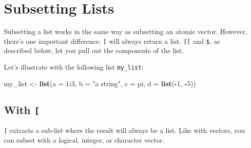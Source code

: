 \documentclass[]{book}
\newenvironment{Shaded}{\begin{snugshade}}{\end{snugshade}}
\newcommand{\KeywordTok}[1]{\textcolor[rgb]{0.13,0.29,0.53}{\textbf{#1}}}
\newcommand{\DataTypeTok}[1]{\textcolor[rgb]{0.13,0.29,0.53}{#1}}
\newcommand{\DecValTok}[1]{\textcolor[rgb]{0.00,0.00,0.81}{#1}}
\newcommand{\StringTok}[1]{\textcolor[rgb]{0.31,0.60,0.02}{#1}}
\newcommand{\CommentTok}[1]{\textcolor[rgb]{0.56,0.35,0.01}{\textit{#1}}}
\newcommand{\OperatorTok}[1]{\textcolor[rgb]{0.81,0.36,0.00}{\textbf{#1}}}
\newcommand{\NormalTok}[1]{#1}
\begin{document}
\section{Subsetting Lists}\label{subsetting-lists}

Subsetting a list works in the same way as subsetting an atomic vector.
However, there's one important difference: \texttt{{[}} will always
return a list. \texttt{{[}{[}} and \texttt{\$}, as described below, let
you pull out the components of the list.

Let's illustrate with the following list \texttt{my\_list}:

\begin{Shaded}
\begin{Highlighting}[]
\NormalTok{my_list <-}\StringTok{ }\KeywordTok{list}\NormalTok{(}\DataTypeTok{a =} \DecValTok{1}\OperatorTok{:}\DecValTok{3}\NormalTok{, }\DataTypeTok{b =} \StringTok{"a string"}\NormalTok{, }\DataTypeTok{c =}\NormalTok{ pi, }\DataTypeTok{d =} \KeywordTok{list}\NormalTok{(}\OperatorTok{-}\DecValTok{1}\NormalTok{, }\OperatorTok{-}\DecValTok{5}\NormalTok{))}
\end{Highlighting}
\end{Shaded}

\subsection{\texorpdfstring{With \texttt{{[}}}{With {[}}}\label{with}

\texttt{{[}} extracts a sub-list where the result will always be a list.
Like with vectors, you can subset with a logical, integer, or character
vector.

\begin{Shaded}
\end{Shaded}
\end{document}
